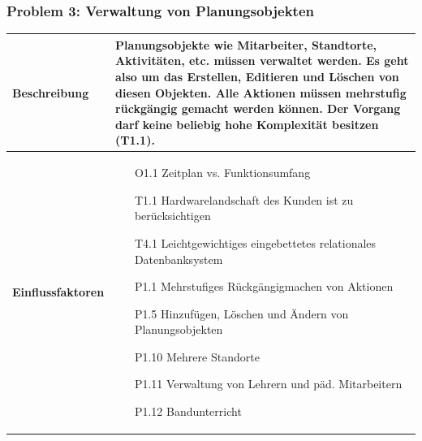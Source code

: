 \documentclass[fontsize=12pt,paper=a4,twoside]{scrartcl}
\begin{document}
\subsubsection{Problem 3: Verwaltung von Planungsobjekten}
\begin{tabularx}{\textwidth}{|p{6cm}|X|}
 \hline
 \textbf{Beschreibung} & Planungsobjekte wie Mitarbeiter, Standtorte, Aktivitäten, etc. müssen verwaltet werden. Es geht also um das Erstellen, Editieren und Löschen von diesen Objekten. Alle Aktionen müssen mehrstufig rückgängig gemacht werden können. Der Vorgang darf keine beliebig hohe Komplexität besitzen (T1.1).\\\hline
 \textbf{Einflussfaktoren} &
 \begin{itemize}
\item[O1.1] Zeitplan vs. Funktionsumfang
\item[T1.1] Hardwarelandschaft des Kunden ist zu berücksichtigen
\item[T4.1] Leichtgewichtiges eingebettetes relationales Datenbanksystem
\item[P1.1] Mehrstufiges Rückgängigmachen von Aktionen
\item[P1.5] Hinzufügen, Löschen und Ändern von Planungsobjekten
\item[P1.10] Mehrere Standorte
\item[P1.11] Verwaltung von Lehrern und päd. Mitarbeitern
\item[P1.12] Bandunterricht
 \end{itemize}\\\hline
\end{tabularx}

\newpage
\end{document}
